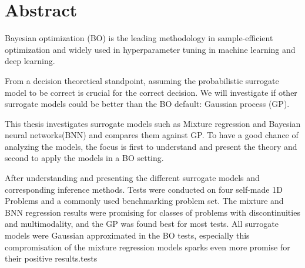 \section*{Abstract}
Bayesian optimization (BO) is the leading methodology in sample-efficient optimization and
widely used in hyperparameter tuning in machine learning and deep learning. 

From a decision theoretical standpoint, assuming the probabilistic surrogate model to be correct
is crucial for the correct decision. We will investigate if other surrogate models could be better
than the BO default: Gaussian process (GP). 

This thesis investigates surrogate models such as Mixture regression and Bayesian neural
networks(BNN) and compares them against GP. To have a good chance of analyzing the
models, the focus is first to understand and present the theory and second to apply the
models in a BO setting. 

After understanding and presenting the different surrogate models and corresponding inference
methods. Tests were conducted on four self-made 1D Problems and a commonly used benchmarking problem
set. The mixture and BNN regression results were promising for classes of problems with
discontinuities and multimodality, and the GP was found best for most tests. All surrogate models
were Gaussian approximated in the BO tests, especially this compromisation of the mixture regression models
sparks even more promise for their positive results.tests



